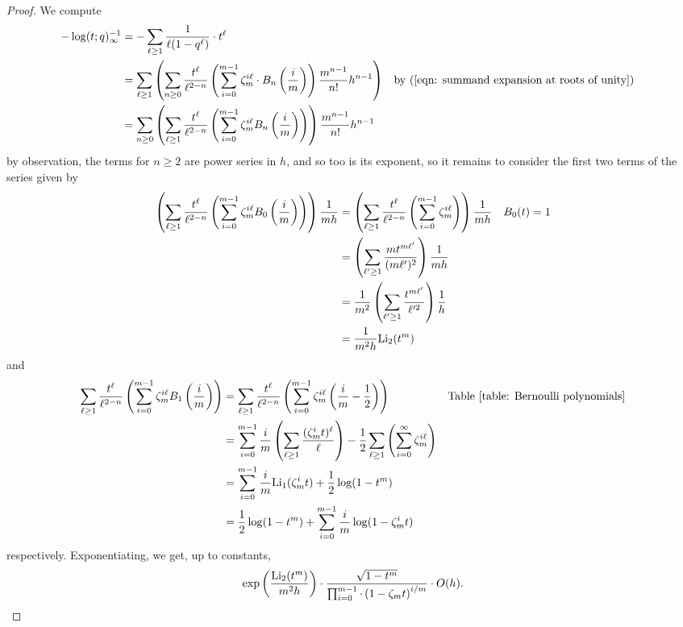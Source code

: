 \begin{proof}
    We compute  
    \begin{align*}
        -\log(t;q)_{\infty}^{-1} &= -\sum_{\ell\geq1}\frac{1}{\ell(1-q^{\ell})}\cdot t^{\ell} \\
        &= \sum_{\ell\geq1}\left(\sum_{n\geq0}\frac{t^{\ell}}{\ell^{2-n}}\left(\sum_{i=0}^{m-1}\zeta_{m}^{i\ell}\cdot B_{n}\left(\frac{i}{m}\right)\right)\frac{m^{n-1}}{n!}h^{n-1}\right)&& \text{by }(\ref{eqn: summand expansion at roots of unity}) \\
        &=\sum_{n\geq0}\left(\sum_{\ell\geq 1}\frac{t^{\ell}}{\ell^{2-n}}\left(\sum_{i=0}^{m-1}\zeta_{m}^{i\ell}B_{n}\left(\frac{i}{m}\right)\right)\right)\frac{m^{n-1}}{n!}h^{n-1}
    \end{align*}
    by observation, the terms for $n\geq 2$ are power series in $h$, and so too is its exponent, so it remains to consider the first two terms of the series given by 
    \begin{align*}
        \left(\sum_{\ell\geq 1}\frac{t^{\ell}}{\ell^{2-n}}\left(\sum_{i=0}^{m-1}\zeta_{m}^{i\ell}B_{0}\left(\frac{i}{m}\right)\right)\right)\frac{1}{mh}&=\left(\sum_{\ell\geq 1}\frac{t^{\ell}}{\ell^{2-n}}\left(\sum_{i=0}^{m-1}\zeta_{m}^{i\ell}\right)\right)\frac{1}{mh}  && B_{0}(t)=1 \\
        &= \left(\sum_{\ell'\geq1}\frac{mt^{m\ell'}}{(m\ell')^{2}}\right)\frac{1}{mh} \\
        &=\frac{1}{m^{2}}\left(\sum_{\ell'\geq1}\frac{t^{m\ell'}}{\ell'^{2}}\right)\frac{1}{h} \\
        &= \frac{1}{m^{2}h}\mathrm{Li}_{2}(t^{m})
    \end{align*}
    and 
    \begin{align*}
        \sum_{\ell\geq 1}\frac{t^{\ell}}{\ell^{2-n}}\left(\sum_{i=0}^{m-1}\zeta_{m}^{i\ell}B_{1}\left(\frac{i}{m}\right)\right)&= \sum_{\ell\geq 1}\frac{t^{\ell}}{\ell^{2-n}}\left(\sum_{i=0}^{m-1}\zeta_{m}^{i\ell}\left(\frac{i}{m}-\frac{1}{2}\right)\right) && \text{Table \ref{table: Bernoulli polynomials}}\\
        &= \sum_{i=0}^{m-1}\frac{i}{m}\left(\sum_{\ell\geq1}\frac{(\zeta_{m}^{i}t)^{\ell}}{\ell}\right)-\frac{1}{2}\sum_{\ell\geq1}\left(\sum_{i=0}^{\infty}\zeta_{m}^{i\ell}\right) \\
        &= \sum_{i=0}^{m-1}\frac{i}{m}\mathrm{Li}_{1}(\zeta_{m}^{i}t) + \frac{1}{2}\log(1-t^{m}) \\
        &= \frac{1}{2}\log(1-t^{m})+\sum_{i=0}^{m-1}\frac{i}{m}\log(1-\zeta_{m}^{i}t)
    \end{align*}
    respectively. Exponentiating, we get, up to constants, 
    $$\exp\left(\frac{\mathrm{Li}_{2}(t^{m})}{m^{2}h}\right)\cdot\frac{\sqrt{1-t^{m}}}{\prod_{i=0}^{m-1}\cdot\left(1-\zeta_{m}t\right)^{i/m}}\cdot O(h).$$
\end{proof}
